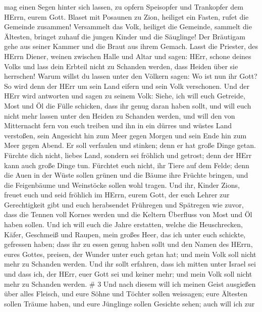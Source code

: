 mag einen Segen hinter sich lassen, zu opfern Speisopfer und Trankopfer
dem HErrn, eurem Gott.  Blaset mit Posaunen zu Zion,
heiliget ein Fasten, rufet die Gemeinde zusammen! 
Versammelt das Volk, heiliget die Gemeinde, sammelt die Ältesten,
bringet zuhauf die jungen Kinder und die Säuglinge! Der Bräutigam gehe
aus seiner Kammer und die Braut aus ihrem Gemach.  Lasst
die Priester, des HErrn Diener, weinen zwischen Halle und Altar und
sagen: HErr, schone deines Volks und lass dein Erbteil nicht zu Schanden
werden, dass Heiden über sie herrschen! Warum willst du lassen unter den
Völkern sagen: Wo ist nun ihr Gott?  So wird denn der HErr
um sein Land eifern und sein Volk verschonen.  Und der HErr
wird antworten und sagen zu seinem Volk: Siehe, ich will euch Getreide,
Most und Öl die Fülle schicken, dass ihr genug daran haben sollt, und
will euch nicht mehr lassen unter den Heiden zu Schanden werden,
 und will den von Mitternacht fern von euch treiben und ihn
in ein dürres und wüstes Land verstoßen, sein Angesicht hin zum Meer
gegen Morgen und sein Ende hin zum Meer gegen Abend. Er soll verfaulen
und stinken; denn er hat große Dinge getan.  Fürchte dich
nicht, liebes Land, sondern sei fröhlich und getrost; denn der HErr kann
auch große Dinge tun.  Fürchtet euch nicht, ihr Tiere auf
dem Felde; denn die Auen in der Wüste sollen grünen und die Bäume ihre
Früchte bringen, und die Feigenbäume und Weinstöcke sollen wohl tragen.
 Und ihr, Kinder Zions, freuet euch und seid fröhlich im
HErrn, eurem Gott, der euch Lehrer zur Gerechtigkeit gibt und euch
herabsendet Frühregen und Spätregen wie zuvor,  dass die
Tennen voll Kornes werden und die Keltern Überfluss von Most und Öl
haben sollen.  Und ich will euch die Jahre erstatten,
welche die Heuschrecken, Käfer, Geschmeiß und Raupen, mein großes Heer,
das ich unter euch schickte, gefressen haben;  dass ihr zu
essen genug haben sollt und den Namen des HErrn, eures Gottes, preisen,
der Wunder unter euch getan hat; und mein Volk soll nicht mehr zu
Schanden werden.  Und ihr sollt erfahren, dass ich mitten
unter Israel sei und dass ich, der HErr, euer Gott sei und keiner mehr;
und mein Volk soll nicht mehr zu Schanden werden. \# 3  Und
nach diesem will ich meinen Geist ausgießen über alles Fleisch, und eure
Söhne und Töchter sollen weissagen; eure Ältesten sollen Träume haben,
und eure Jünglinge sollen Gesichte sehen;  auch will ich zur

